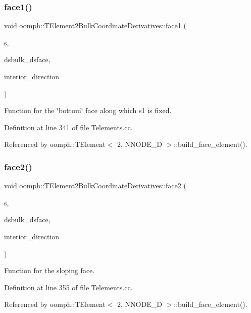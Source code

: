\subsubsection{\texorpdfstring{face1()}{face1()}}
{\footnotesize\ttfamily void oomph\+::\+T\+Element2\+Bulk\+Coordinate\+Derivatives\+::face1 (\begin{DoxyParamCaption}\item[{const \hyperlink{classoomph_1_1Vector}{Vector}$<$ double $>$ \&}]{s,  }\item[{\hyperlink{classoomph_1_1DenseMatrix}{Dense\+Matrix}$<$ double $>$ \&}]{dsbulk\+\_\+dsface,  }\item[{unsigned \&}]{interior\+\_\+direction }\end{DoxyParamCaption})}



Function for the \char`\"{}bottom\char`\"{} face along which s1 is fixed. 



Definition at line 341 of file Telements.\+cc.



Referenced by oomph\+::\+T\+Element$<$ 2, N\+N\+O\+D\+E\+\_\+D $>$\+::build\+\_\+face\+\_\+element().

\mbox{\label{namespaceoomph_1_1TElement2BulkCoordinateDerivatives_ac9d53ae399bc8c272d584004bca77b9d}} 
\subsubsection{\texorpdfstring{face2()}{face2()}}
{\footnotesize\ttfamily void oomph\+::\+T\+Element2\+Bulk\+Coordinate\+Derivatives\+::face2 (\begin{DoxyParamCaption}\item[{const \hyperlink{classoomph_1_1Vector}{Vector}$<$ double $>$ \&}]{s,  }\item[{\hyperlink{classoomph_1_1DenseMatrix}{Dense\+Matrix}$<$ double $>$ \&}]{dsbulk\+\_\+dsface,  }\item[{unsigned \&}]{interior\+\_\+direction }\end{DoxyParamCaption})}



Function for the sloping face. 



Definition at line 355 of file Telements.\+cc.



Referenced by oomph\+::\+T\+Element$<$ 2, N\+N\+O\+D\+E\+\_\+D $>$\+::build\+\_\+face\+\_\+element().

